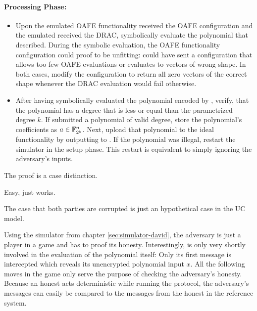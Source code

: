 \paragraph{Processing Phase:}

\begin{itemize}

  \item Upon the emulated OAFE functionality received the OAFE configuration and
    the emulated \JWpTwo{} received the DRAC, symbolically evaluate the
    polynomial that \JWadv{} described. During the symbolic evaluation, the OAFE
    functionality configuration could proof to be unfitting: \JWadv{} could
    have sent a configuration that allows too few OAFE evaluations or evaluates
    to vectors of wrong shape. In both cases, modify the configuration to return
    all zero vectors of the correct shape whenever the DRAC evaluation would
    fail otherwise.

  \item After having symbolically evaluated the polynomial encoded by \JWadv{},
    verify, that the polynomial has a degree that is less or equal than the
    parametrized degree $k$. If \JWadv{} submitted a polynomial of valid
    degree, store the polynomial's coefficients as $a \in \mathbb{F}_{2^k}^n$.
    Next, upload that polynomial to the ideal functionality \JWfuncSymOPEnp{} by
    outputting  to \JWfuncSymOPEnp{}.  If the polynomial
    was illegal, restart the simulator in the setup phase.  This restart is
    equivalent to simply ignoring the adversary's inputs.

\end{itemize}


%
%
\label{sec:proof}

The proof is a case distinction.



Easy, just works.




The case that both parties are corrupted is just an hypothetical case in the UC
model.



Using the simulator from chapter \ref{sec:simulator-david}, the adversary
\JWadv{} is just a player in a game and has to proof its honesty. Interestingly,
\JWadv{} is only very shortly involved in the evaluation of the polynomial
itself: Only its first message is intercepted which reveals its unencrypted
polynomial input $x$. All the following moves in the game only serve the purpose
of checking the adversary's honesty. Because an honest \JWpTwo{} acts
deterministic while running the protocol, the adversary's messages can easily be
compared to the messages from the honest \JWpTwo{} in the reference system.

